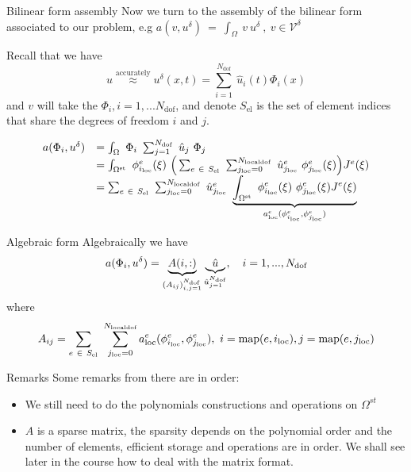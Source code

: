 \begin{frame}{Bilinear form assembly}
  Now we turn to the assembly of the bilinear form associated to our
  problem, e.g $a(v, u^\delta)\ =\ \int_\Omega\ v\ u^\delta\ ,\  v \in \mathcal{V}^\delta$

  Recall that we have
  \begin{equation}
    \label{eq:59}
    u \stackrel{\text{accurately}}{\approx}  u^{\delta }(x, t ) = \sum_{i=1}^{N_{\text{dof}}}\ \hat{u}_i(t) \Phi_i(x)
  \end{equation}
  and $v$ will take the $\Phi_i, i=1,...N_{\text{dof}}$, and denote
  $S_{\text{el}}$ is the set of element indices that share the degrees
  of freedom $i$ and $j$.

  \begin{equation}
    \label{eq:60}
    \begin{array}[c]{rl}
      a(\Phi_i, u^\delta) & = \int_\Omega\ \Phi_i\ \sum_{j=1}^{\ndof}\ \hat{u}_j\ \Phi_j \\
      & = \int_{\Omega^{\text{st}}} \ \phi^e_\iloc(\xi)\ \Big( \sum_{e\ \in\ S_{\text{el}}}\ \sum_{\jloc=0}^{\nldof}\ \hat{u}_\jloc^e\ \phi_\jloc^e(\xi) \Big) J^e(\xi) \\
      & = \sum_{e\ \in\ S_{\text{el}}}\ \sum_{\jloc=0}^{\nldof}\ \hat{u}_\jloc^e\ \underbrace{\int_{\Omega^{\text{st}}} \ \phi^e_\iloc(\xi)\   \phi_\jloc^e(\xi)  J^e(\xi)}_{\aloc{e}(\phi^e_\iloc, \phi^e_\jloc)} 
    \end{array}
  \end{equation}
\end{frame}
\begin{frame}{Algebraic form}
  Algebraically we have
  \begin{equation}
    \label{eq:61}
    a(\Phi_i, u^\delta) = \underbrace{A(i,:)}_{(A_{ij})_{i,j=1}^{N_{\text{dof}}} } \underbrace{\hat{u}}_{\hat{u}_{j=1}^{N_\text{dof}}},\quad i = 1,...,{N_{\text{dof}}}
  \end{equation}
  where
  \begin{equation}
    \label{eq:62}
    A_{ij} = \sum_{e\ \in\ S_{\text{el}}}\ \sum_{{j_{\text{loc}}}=0}^{{N_{\text{localdof}}}} {a^{e}_{\text{loc}}}(\phi^e_{i_{\text{loc}}},\phi^e_{j_{\text{loc}}}),\ i = \text{map}(e,{i_{\text{loc}}}), j = \text{map}(e,{j_{\text{loc}}})
  \end{equation}
\end{frame}

\begin{frame}{Remarks}
  Some remarks from there are in order:
  \begin{itemize}
  \item We still need to do the polynomials constructions and
    operations on $\Omega^{st}$
  \item $A$ is a sparse matrix, the sparsity depends on the polynomial
    order and the number of elements, efficient storage and operations
    are in order. We shall see later in the course how to deal with
    the matrix format.
  \end{itemize}
\end{frame}

